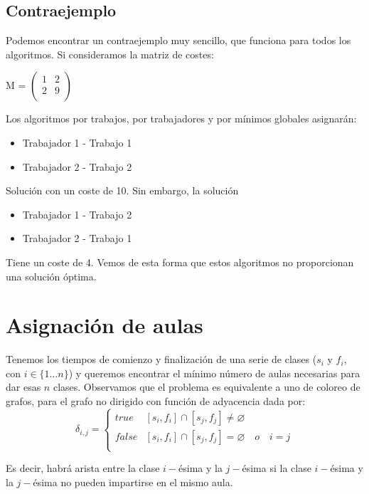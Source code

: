 \documentclass[a4paper, 11pt]{article} %
\let\emptyset\varnothing
\begin{document}
	\subsection{Contraejemplo}
	Podemos encontrar un contraejemplo muy sencillo, que funciona para todos los algoritmos. Si consideramos la matriz de costes:
	
	\centering
	M = $\begin{pmatrix}
	    		1 & 2\\
	    		2 & 9\\
	\end{pmatrix}$
	\flushleft
	
	Los algoritmos por trabajos, por trabajadores y por mínimos globales asignarán: 
	\begin{itemize}
	\item{Trabajador 1 - Trabajo 1}
	\item{Trabajador 2 - Trabajo 2}
	\end{itemize}
		
	Solución con un coste de 10. Sin embargo, la solución 
		
	\begin{itemize}
	\item{Trabajador 1 - Trabajo 2}
	\item{Trabajador 2 - Trabajo 1}
	\end{itemize}
	  
	Tiene un coste de 4. Vemos de esta forma que estos algoritmos no proporcionan una solución óptima. 
	

\section{Asignación de aulas}
Tenemos los tiempos de comienzo y finalización de una serie de clases
($s_i$ y $f_i$, con $i\in\{1\ldots n\}$) y queremos encontrar el mínimo número de aulas necesarias
para dar esas $n$ clases.
Observamos que el problema es equivalente a uno de coloreo de grafos, para
el grafo no dirigido con función de adyacencia dada por:
$$\delta_{i,j}=\left\{\begin{array}{ll}
  true  & [s_i,f_i] \cap [s_j,f_j] \neq \emptyset \\
  false  & [s_i,f_i]\cap[s_j,f_j] = \emptyset\quad o\quad i=j\\
  \end{array}\right.$$

Es decir, habrá arista entre la clase $i-$ésima y la $j-$ésima si la
clase $i-$ésima y la $j-$ésima no pueden impartirse en el mismo aula.
\end{document}
